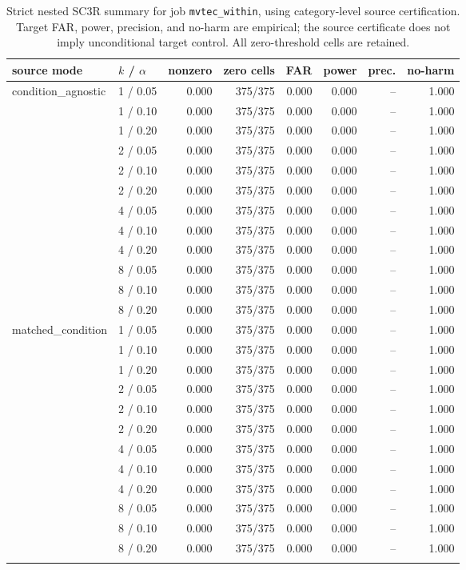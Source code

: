 \begin{table}[t]
\centering
\caption{Strict nested SC3R summary for job \texttt{mvtec\_within}, using category-level source certification. Target FAR, power, precision, and no-harm are empirical; the source certificate does not imply unconditional target control. All zero-threshold cells are retained.}
\label{tab:nested-sc3r-mvtec-within}
\footnotesize
\setlength{\tabcolsep}{4pt}
\begin{tabular}{llrrrrrr}
\toprule
source mode & $k$ / $\alpha$ & nonzero & zero cells & FAR & power & prec. & no-harm \\
\midrule
condition\_agnostic & 1 / 0.05 & 0.000 & 375/375 & 0.000 & 0.000 & -- & 1.000 \\
 & 1 / 0.10 & 0.000 & 375/375 & 0.000 & 0.000 & -- & 1.000 \\
 & 1 / 0.20 & 0.000 & 375/375 & 0.000 & 0.000 & -- & 1.000 \\
 & 2 / 0.05 & 0.000 & 375/375 & 0.000 & 0.000 & -- & 1.000 \\
 & 2 / 0.10 & 0.000 & 375/375 & 0.000 & 0.000 & -- & 1.000 \\
 & 2 / 0.20 & 0.000 & 375/375 & 0.000 & 0.000 & -- & 1.000 \\
 & 4 / 0.05 & 0.000 & 375/375 & 0.000 & 0.000 & -- & 1.000 \\
 & 4 / 0.10 & 0.000 & 375/375 & 0.000 & 0.000 & -- & 1.000 \\
 & 4 / 0.20 & 0.000 & 375/375 & 0.000 & 0.000 & -- & 1.000 \\
 & 8 / 0.05 & 0.000 & 375/375 & 0.000 & 0.000 & -- & 1.000 \\
 & 8 / 0.10 & 0.000 & 375/375 & 0.000 & 0.000 & -- & 1.000 \\
 & 8 / 0.20 & 0.000 & 375/375 & 0.000 & 0.000 & -- & 1.000 \\
\addlinespace[2pt]
matched\_condition & 1 / 0.05 & 0.000 & 375/375 & 0.000 & 0.000 & -- & 1.000 \\
 & 1 / 0.10 & 0.000 & 375/375 & 0.000 & 0.000 & -- & 1.000 \\
 & 1 / 0.20 & 0.000 & 375/375 & 0.000 & 0.000 & -- & 1.000 \\
 & 2 / 0.05 & 0.000 & 375/375 & 0.000 & 0.000 & -- & 1.000 \\
 & 2 / 0.10 & 0.000 & 375/375 & 0.000 & 0.000 & -- & 1.000 \\
 & 2 / 0.20 & 0.000 & 375/375 & 0.000 & 0.000 & -- & 1.000 \\
 & 4 / 0.05 & 0.000 & 375/375 & 0.000 & 0.000 & -- & 1.000 \\
 & 4 / 0.10 & 0.000 & 375/375 & 0.000 & 0.000 & -- & 1.000 \\
 & 4 / 0.20 & 0.000 & 375/375 & 0.000 & 0.000 & -- & 1.000 \\
 & 8 / 0.05 & 0.000 & 375/375 & 0.000 & 0.000 & -- & 1.000 \\
 & 8 / 0.10 & 0.000 & 375/375 & 0.000 & 0.000 & -- & 1.000 \\
 & 8 / 0.20 & 0.000 & 375/375 & 0.000 & 0.000 & -- & 1.000 \\
\addlinespace[2pt]
\bottomrule
\end{tabular}
\end{table}

